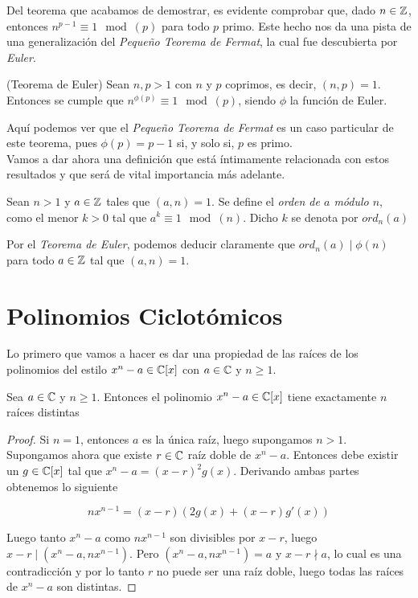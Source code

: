 Del teorema que acabamos de demostrar, es evidente comprobar que, dado $n \in \mathbb{Z}$, entonces $n^{p-1} \equiv 1 \mod(p)$ para todo $p$ primo. Este hecho nos da una pista de una generalización del \textit{Pequeño Teorema de Fermat}, la cual fue descubierta por \textit{Euler}.

\begin{teorema}{(Teorema de Euler)}\label{teorema_de_euler}
	Sean $n, p > 1$ con $n$ y $p$ coprimos, es decir, $(n, p) = 1$. Entonces se cumple que $n^{\phi(p)} \equiv 1 \mod(p)$, siendo $\phi$ la función de Euler.
\end{teorema}

Aquí podemos ver que el \textit{Pequeño Teorema de Fermat} es un caso particular de este teorema, pues $\phi(p) = p-1$ si, y solo si, $p$ es primo.\\

Vamos a dar ahora una definición que está íntimamente relacionada con estos resultados y que será de vital importancia más adelante.

\begin{definicion}
	Sean $n > 1$ y $a \in \mathbb{Z}$ tales que $(a, n) = 1$. Se define el \textit{orden de $a$ módulo $n$}, como el menor $k > 0$ tal que $a^k \equiv 1 \mod(n)$. Dicho $k$ se denota por $ord_n(a)$
\end{definicion}

Por el \textit{Teorema de Euler}, podemos deducir claramente que $ord_n(a) \mid \phi(n)$ para todo $a \in \mathbb{Z}$ tal que $(a, n) = 1$.

\section{Polinomios Ciclotómicos}

Lo primero que vamos a hacer es dar una propiedad de las raíces de los polinomios del estilo $x^n - a \in \mathbb{C}[x]$ con $a \in \mathbb{C}$ y $n \geq 1$.

\begin{lema}
	Sea $a \in \mathbb{C}$ y $n \geq 1$. Entonces el polinomio $x^n - a \in \mathbb{C}[x]$ tiene exactamente $n$ raíces distintas
\end{lema}

\begin{proof}
	Si $n = 1$, entonces $a$ es la única raíz, luego supongamos $n > 1$.\\
	
	Supongamos ahora que existe $r \in \mathbb{C}$ raíz doble de $x^n - a$. Entonces debe existir un $g \in \mathbb{C}[x]$ tal que $x^n - a = (x - r)^2g(x)$. Derivando ambas partes obtenemos lo siguiente
	
	\[ nx^{n-1} = (x - r)(2g(x) + (x - r)g'(x)) \]
	
	Luego tanto $x^n - a$ como $nx^{n-1}$ son divisibles por $x - r$, luego $x - r \mid (x^n - a, nx^{n-1})$. Pero $(x^n - a, nx^{n-1}) = a$ y $x - r \nmid a$, lo cual es una contradicción y por lo tanto $r$ no puede ser una raíz doble, luego todas las raíces de $x^n - a$ son distintas.
\end{proof}

